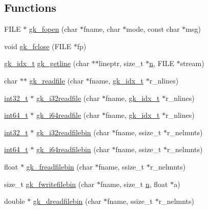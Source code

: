\subsection*{Functions}
\begin{DoxyCompactItemize}
\item 
F\+I\+LE $\ast$ \hyperlink{a00855_abff04948821f625a3e59666e61c70e2f}{gk\+\_\+fopen} (char $\ast$fname, char $\ast$mode, const char $\ast$msg)
\item 
void \hyperlink{a00855_a70dec19fefaf0c84f3948b4679a73fec}{gk\+\_\+fclose} (F\+I\+LE $\ast$fp)
\item 
\hyperlink{a00083_a899f9d8c47b1ca0c2fead41097f4bde2}{gk\+\_\+idx\+\_\+t} \hyperlink{a00855_ad8263f64108434d7ebab9799b5ab9632}{gk\+\_\+getline} (char $\ast$$\ast$lineptr, size\+\_\+t $\ast$\hyperlink{a00623_a781a04ab095280f838ff3eb0e51312e0}{n}, F\+I\+LE $\ast$stream)
\item 
char $\ast$$\ast$ \hyperlink{a00855_ad13e689608e193482a6f30b1ade87814}{gk\+\_\+readfile} (char $\ast$fname, \hyperlink{a00083_a899f9d8c47b1ca0c2fead41097f4bde2}{gk\+\_\+idx\+\_\+t} $\ast$r\+\_\+nlines)
\item 
\hyperlink{a00119_a37994e3b11c72957c6f454c6ec96d43d}{int32\+\_\+t} $\ast$ \hyperlink{a00855_a201c46a9a2bf9c06a917f259d109b7ee}{gk\+\_\+i32readfile} (char $\ast$fname, \hyperlink{a00083_a899f9d8c47b1ca0c2fead41097f4bde2}{gk\+\_\+idx\+\_\+t} $\ast$r\+\_\+nlines)
\item 
\hyperlink{a00119_a67a9885ef4908cb72ce26d75b694386c}{int64\+\_\+t} $\ast$ \hyperlink{a00855_a8cb19aa95a831aa745f6e04e1cc0b204}{gk\+\_\+i64readfile} (char $\ast$fname, \hyperlink{a00083_a899f9d8c47b1ca0c2fead41097f4bde2}{gk\+\_\+idx\+\_\+t} $\ast$r\+\_\+nlines)
\item 
\hyperlink{a00119_a37994e3b11c72957c6f454c6ec96d43d}{int32\+\_\+t} $\ast$ \hyperlink{a00855_afbb9b4e2327d298a79924028441a0fdb}{gk\+\_\+i32readfilebin} (char $\ast$fname, ssize\+\_\+t $\ast$r\+\_\+nelmnts)
\item 
\hyperlink{a00119_a67a9885ef4908cb72ce26d75b694386c}{int64\+\_\+t} $\ast$ \hyperlink{a00855_aca460764497638a612f886a089662416}{gk\+\_\+i64readfilebin} (char $\ast$fname, ssize\+\_\+t $\ast$r\+\_\+nelmnts)
\item 
float $\ast$ \hyperlink{a00855_a825d4634e2e656bc3dc9f3af0c9b1d5d}{gk\+\_\+freadfilebin} (char $\ast$fname, ssize\+\_\+t $\ast$r\+\_\+nelmnts)
\item 
size\+\_\+t \hyperlink{a00855_a44ee9129d983bd435f96f9c1404f603d}{gk\+\_\+fwritefilebin} (char $\ast$fname, size\+\_\+t \hyperlink{a00623_a781a04ab095280f838ff3eb0e51312e0}{n}, float $\ast$a)
\item 
double $\ast$ \hyperlink{a00855_a2a9dbcb6a3f167b0fd20e431612e5aa9}{gk\+\_\+dreadfilebin} (char $\ast$fname, ssize\+\_\+t $\ast$r\+\_\+nelmnts)
\end{DoxyCompactItemize}


